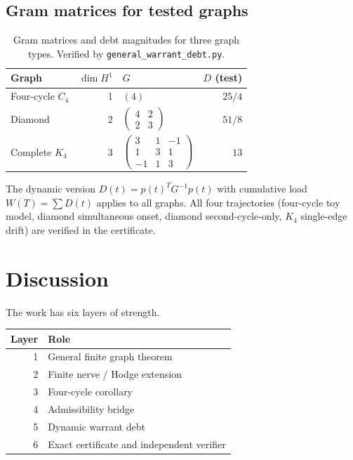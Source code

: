 \documentclass[11pt]{article}
\begin{document}
\subsection*{Gram matrices for tested graphs}
\begin{table}[h]
\centering
\begin{tabular}{l r l r}
\toprule
Graph & $\dim H^1$ & $G$ & $D$ (test) \\
\midrule
Four-cycle $C_4$ & 1 & $(4)$ & $25/4$ \\
Diamond & 2 & $\begin{pmatrix}4&2\\2&3\end{pmatrix}$ & $51/8$ \\
Complete $K_4$ & 3 & $\begin{pmatrix}3&1&{-1}\\1&3&1\\{-1}&1&3\end{pmatrix}$ & $13$ \\
\bottomrule
\end{tabular}
\caption{Gram matrices and debt magnitudes for three graph types.
Verified by \texttt{general\_warrant\_debt.py}.}
\end{table}

The dynamic version $D(t)=p(t)^TG^{-1}p(t)$ with cumulative load $W(T)=\sum D(t)$
applies to all graphs. All four trajectories (four-cycle toy model, diamond
simultaneous onset, diamond second-cycle-only, $K_4$ single-edge drift) are
verified in the certificate.

\section{Discussion}
The work has six layers of strength.

\begin{center}
\begin{tabular}{r l}
\toprule
Layer & Role \\
\midrule
1 & General finite graph theorem \\
2 & Finite nerve / Hodge extension \\
3 & Four-cycle corollary \\
4 & Admissibility bridge \\
5 & Dynamic warrant debt \\
6 & Exact certificate and independent verifier \\
\bottomrule
\end{tabular}
\end{center}
\end{document}
